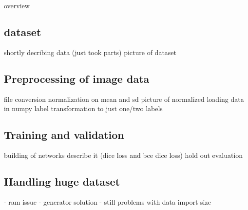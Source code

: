 
overview

\subsection{dataset}
shortly decribing data (just took parts)
picture of dataset

\subsection{Preprocessing of image data}
file conversion
normalization on mean and sd
picture of normalized
loading data in numpy
label transformation to just one/two labels

\subsection{Training and validation}

building of networks
describe it (dice loss and bce dice loss)
hold out evaluation

\subsection{Handling huge dataset}
- ram issue
- generator solution
- still problems with data import size



